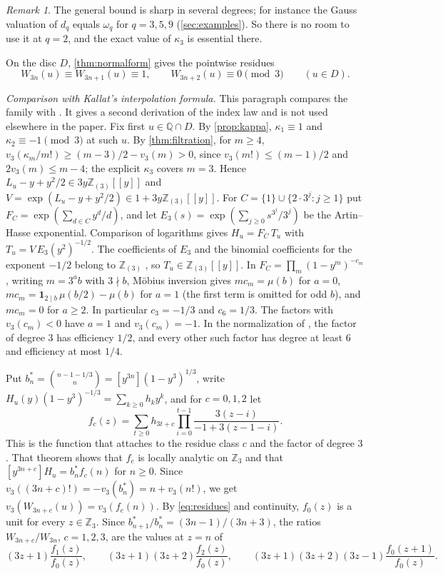 \documentclass[11pt,reqno]{amsart}
\theoremstyle{definition}
\theoremstyle{remark}
\newtheorem{remark}[theorem]{Remark}
\theoremstyle{plain}
\newcommand{\Z}{\mathbb Z}
\newcommand{\Q}{\mathbb Q}
\newcommand{\Zloc}{\mathbb Z_{(3)}}
\begin{document}
\begin{remark}
The general bound is sharp in several degrees; for instance the Gauss valuation of $d_q$ equals $\omega_q$ for $q=3,5,9$ (\cref{sec:examples}). So there is no room to use it at $q=2$, and the exact value of $\kappa_3$ is essential there.
\end{remark}

On the disc $D$, \cref{thm:normalform} gives the pointwise residues
\begin{equation}\label{eq:residues}
W_{3n}(u)\equiv W_{3n+1}(u)\equiv1,\qquad W_{3n+2}(u)\equiv0\pmod 3\qquad(u\in D).
\end{equation}

\medskip\noindent\textit{Comparison with Kallat's interpolation formula.}
This paragraph compares the family with \cite[Thm.~12.1]{Kallat2026a}. It gives a second derivation of the index law and is not used elsewhere in the paper.
Fix first $u\in\Q\cap D$. By \cref{prop:kappa}, $\kappa_1\equiv1$ and $\kappa_2\equiv-1\pmod3$ at such $u$. By \cref{thm:filtration}, for $m\ge4$, $v_3(\kappa_m/m!)\ge(m-3)/2-v_3(m)>0$, since $v_3(m!)\le(m-1)/2$ and $2v_3(m)\le m-4$; the explicit $\kappa_3$ covers $m=3$. Hence $L_u-y+y^2/2\in3y\Zloc[[y]]$ and $V=\exp(L_u-y+y^2/2)\in1+3y\Zloc[[y]]$.
For $C=\{1\}\cup\{2\cdot3^j:j\ge1\}$ put $F_C=\exp(\sum_{d\in C}y^d/d)$, and let $E_3(s)=\exp(\sum_{j\ge0}s^{3^j}/3^j)$ be the Artin--Hasse exponential. Comparison of logarithms gives $H_u=F_C\,T_u$ with $T_u=V\,E_3(y^2)^{-1/2}$. The coefficients of $E_3$ and the binomial coefficients for the exponent $-1/2$ belong to $\Zloc$ \cite[Ch.~IV, \S2.3 and Ch.~VII, \S\S2.1--2.2]{Robert2000}, so $T_u\in\Zloc[[y]]$.
In $F_C=\prod_m(1-y^m)^{-c_m}$ \cite[Lemma~8.1]{Kallat2026a}, writing $m=3^ab$ with $3\nmid b$, M\"obius inversion gives $mc_m=\mu(b)$ for $a=0$, $mc_m=\mathbf 1_{2\mid b}\,\mu(b/2)-\mu(b)$ for $a=1$ (the first term is omitted for odd $b$), and $mc_m=0$ for $a\ge2$. In particular $c_3=-1/3$ and $c_6=1/3$. The factors with $v_3(c_m)<0$ have $a=1$ and $v_3(c_m)=-1$. In the normalization of \cite[\S8.8]{Kallat2026a}, the factor of degree $3$ has efficiency $1/2$, and every other such factor has degree at least $6$ and efficiency at most $1/4$.

Put $b_n^*=\binom{n-1-1/3}{n}=[y^{3n}](1-y^3)^{1/3}$, write $H_u(y)(1-y^3)^{-1/3}=\sum_{k\ge0}h_ky^k$, and for $c=0,1,2$ let
\[
 f_c(z)=\sum_{t\ge0}h_{3t+c}\prod_{i=0}^{t-1}\frac{3(z-i)}{-1+3(z-1-i)} .
\]
This is the function that \cite[Thm.~12.1]{Kallat2026a} attaches to the residue class $c$ and the factor of degree $3$. That theorem shows that $f_c$ is locally analytic on $\Z_3$ and that $[y^{3n+c}]H_u=b_n^*f_c(n)$ for $n\ge0$. Since $v_3((3n+c)!)=-v_3(b_n^*)=n+v_3(n!)$, we get $v_3(W_{3n+c}(u))=v_3(f_c(n))$. By \eqref{eq:residues} and continuity, $f_0(z)$ is a unit for every $z\in\Z_3$. Since $b_{n+1}^*/b_n^*=(3n-1)/(3n+3)$, the ratios $W_{3n+c}/W_{3n}$, $c=1,2,3$, are the values at $z=n$ of
\[
 (3z+1)\frac{f_1(z)}{f_0(z)},\qquad
 (3z+1)(3z+2)\frac{f_2(z)}{f_0(z)},\qquad
 (3z+1)(3z+2)(3z-1)\frac{f_0(z+1)}{f_0(z)} .
\]
\end{document}
